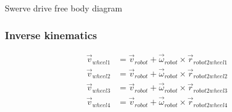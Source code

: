 \begin{bookfigure}

  \caption{Swerve drive free body diagram}
  \label{fig:swerve_drive_fbd}
\end{bookfigure}

\subsubsection{Inverse kinematics}
\begin{align*}
  \vec{v}_{wheel1} &= \vec{v}_{robot} + \vec{\omega}_{robot} \times
    \vec{r}_{robot2wheel1} \\
  \vec{v}_{wheel2} &= \vec{v}_{robot} + \vec{\omega}_{robot} \times
    \vec{r}_{robot2wheel2} \\
  \vec{v}_{wheel3} &= \vec{v}_{robot} + \vec{\omega}_{robot} \times
    \vec{r}_{robot2wheel3} \\
  \vec{v}_{wheel4} &= \vec{v}_{robot} + \vec{\omega}_{robot} \times
    \vec{r}_{robot2wheel4}
\end{align*}

